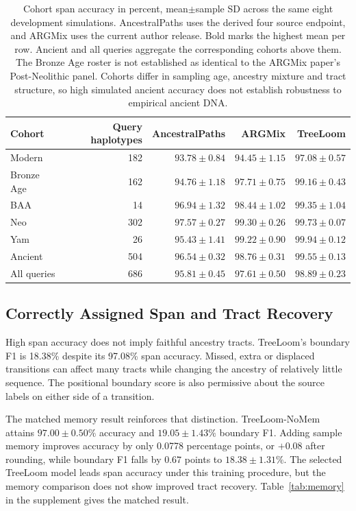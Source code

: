\documentclass[letterpaper]{article}
\newcommand{\best}[1]{\mathbf{#1}}
\begin{document}
\begin{table}[t]
\centering
\small
\begin{tabular}{@{}lrrrr@{}}
\toprule
Cohort & Query haplotypes & AncestralPaths & ARGMix & TreeLoom\\
\midrule
Modern &182&$93.78\pm0.84$&$94.45\pm1.15$&$\best{97.08\pm0.57}$\\
Bronze Age &162&$94.76\pm1.18$&$97.71\pm0.75$&$\best{99.16\pm0.43}$\\
BAA &14&$96.94\pm1.32$&$98.44\pm1.02$&$\best{99.35\pm1.04}$\\
Neo &302&$97.57\pm0.27$&$99.30\pm0.26$&$\best{99.73\pm0.07}$\\
Yam &26&$95.43\pm1.41$&$99.22\pm0.90$&$\best{99.94\pm0.12}$\\
Ancient &504&$96.54\pm0.32$&$98.76\pm0.31$&$\best{99.55\pm0.13}$\\
All queries &686&$95.81\pm0.45$&$97.61\pm0.50$&$\best{98.89\pm0.23}$\\
\bottomrule
\end{tabular}
\caption{Cohort span accuracy in percent, mean$\pm$sample SD across the same eight development simulations. AncestralPaths uses the derived four source endpoint, and ARGMix uses the current author release. Bold marks the highest mean per row. Ancient and all queries aggregate the corresponding cohorts above them. The Bronze Age roster is not established as identical to the ARGMix paper's Post-Neolithic panel. Cohorts differ in sampling age, ancestry mixture and tract structure, so high simulated ancient accuracy does not establish robustness to empirical ancient DNA.}
\label{tab:cohorts}
\end{table}

\subsection{Correctly Assigned Span and Tract Recovery}
High span accuracy does not imply faithful ancestry tracts. TreeLoom's boundary F1 is 18.38\% despite its 97.08\% span accuracy. Missed, extra or displaced transitions can affect many tracts while changing the ancestry of relatively little sequence. The positional boundary score is also permissive about the source labels on either side of a transition.

The matched memory result reinforces that distinction. TreeLoom-NoMem attains $97.00\pm0.50\%$ accuracy and $19.05\pm1.43\%$ boundary F1. Adding sample memory improves accuracy by only 0.0778 percentage points, or $+0.08$ after rounding, while boundary F1 falls by $0.67$ points to $18.38\pm1.31\%$. The selected TreeLoom model leads span accuracy under this training procedure, but the memory comparison does not show improved tract recovery. Table~\ref{tab:memory} in the supplement gives the matched result.
\end{document}
